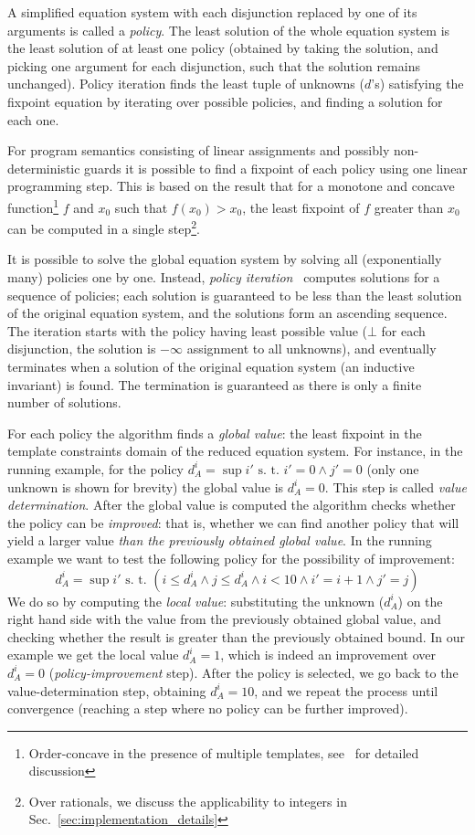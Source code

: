 \documentclass{llncs}
\begin{document}
A simplified equation system with each disjunction replaced by 
one of its arguments is called a \emph{policy}.
The least solution of the whole equation system is the least solution of at
least one policy
(obtained by taking the solution, and picking one argument for each disjunction,
such that the solution remains unchanged).
Policy iteration finds the least tuple of unknowns ($d$'s)
satisfying the fixpoint equation by iterating over possible policies, and
finding a solution for each one.

For program semantics consisting of linear assignments and possibly
non-deterministic guards
it is possible to find a fixpoint of each policy using one linear programming
step.
This is based on the result that for a  monotone and concave function\footnote{Order-concave in the presence of multiple templates,
    see~\cite{max_strategy_templates} for detailed discussion}
$f$ and $x_0$ such that $f(x_0) > x_0$, the least fixpoint of $f$
greater than $x_0$ can be computed in a single step\footnote{Over rationals, we discuss the applicability to integers in
    Sec.~\ref{sec:implementation_details}}.

It is possible to solve the global equation system by solving all
(exponentially many) policies one by one.
Instead, \emph{policy iteration}~\cite{max_strategy_templates} computes solutions
for a sequence of policies;
each solution is guaranteed to be less than the least solution of the original equation system,
and the solutions form an ascending sequence.
The iteration starts with the policy having least possible value
($\bot$ for each disjunction,
the solution is $-\infty$ assignment to all unknowns), and eventually terminates
when a solution of the original equation system (an inductive invariant) is found.
The termination is guaranteed as there is only a finite number of solutions.

For each policy the algorithm finds a \emph{global value}: the least fixpoint in the template
constraints domain of the reduced equation system.
For instance, in the running example, for the policy
$d^i_A = \sup{i'} \mbox{ s. t. } i' = 0 \land j' = 0$ (only one unknown is
shown for brevity) the global value is $d^i_A = 0$.
This step is called \emph{value determination}.
After the global value is computed the algorithm checks whether the policy can be
\emph{improved}: that is, whether we can find another policy that will yield a
larger value \emph{than the previously obtained global value}.
In the running example we want to test the following policy
for the possibility of improvement:
\[d^i_A = \sup{i'} \mbox{ s. t. } (i \leq d^{i}_{A} \land j \leq d^i_A \land i <
10 \land i' = i + 1 \land j' = j)\]
We do so by computing the \emph{local value}: substituting the unknown ($d^i_A$) on the
right hand side with the value from the previously obtained global value, and
checking whether the result is greater than the previously obtained bound.
In our example we get the local value $d^i_A = 1$, which is indeed an
improvement over $d^i_A = 0$ (\emph{policy-improvement} step).
After the policy is selected, we go back to the value-determination step, obtaining
$d^i_A = 10$, and we repeat the process until convergence (reaching a step where no
policy can be further improved).
\end{document}
